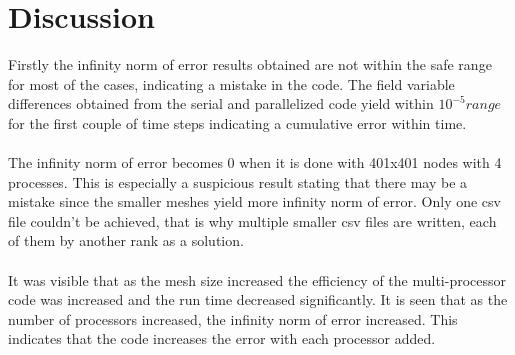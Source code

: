 \documentclass{article}
\begin{document}
\section{Discussion}
Firstly the infinity norm of error results obtained are not within the safe range for most of the cases, indicating a mistake in the code. The field variable differences obtained from the serial and parallelized code yield within $10^{-5} range$ for the first couple of time steps indicating a cumulative error within time. \\
\\The infinity norm of error becomes 0 when it is done with 401x401 nodes with 4 processes. This is especially a suspicious result stating that there may be a mistake since the smaller meshes yield more infinity norm of error. Only one csv file couldn't be achieved, that is why multiple smaller csv files are written, each of them by another rank as a solution.\\
\\It was visible that as the mesh size increased the efficiency of the multi-processor code was increased and the run time decreased significantly. It is seen that as the number of processors increased, the infinity norm of error increased. This indicates that the code increases the error with each processor added.
\end{document}
